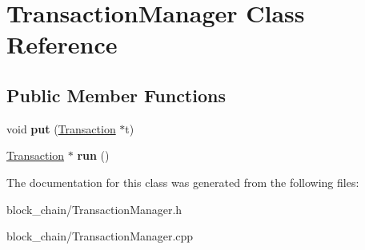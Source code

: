 \hypertarget{classTransactionManager}{}\section{Transaction\+Manager Class Reference}
\label{classTransactionManager}
\subsection*{Public Member Functions}
\begin{DoxyCompactItemize}
\item 
\mbox{\label{classTransactionManager_a7956f511249bba3466ce3f3b57ee4518}} 
void {\bfseries put} (\mbox{\hyperlink{classTransaction}{Transaction}} $\ast$t)
\item 
\mbox{\label{classTransactionManager_a27147afb36545b306a277697cd9a773d}} 
\mbox{\hyperlink{classTransaction}{Transaction}} $\ast$ {\bfseries run} ()
\end{DoxyCompactItemize}


The documentation for this class was generated from the following files\+:\begin{DoxyCompactItemize}
\item 
block\+\_\+chain/Transaction\+Manager.\+h\item 
block\+\_\+chain/Transaction\+Manager.\+cpp\end{DoxyCompactItemize}
